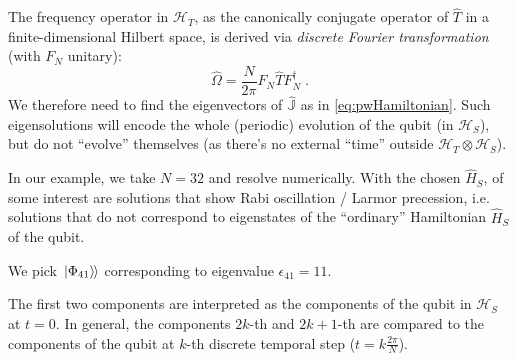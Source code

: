 \documentclass[a0,portrait]{a0poster}
\newcommand{\hilb}[1]{\mathcal{#1}}       %
\newcommand{\ox}{\otimes}
\newcommand{\smallback}{\hspace{-0.115em}}
\newcommand{\dket}[1]{\left.\left| #1 \right\rangle\smallback\right\rangle}
\begin{document}
\begin{multicols}{2}

The frequency operator in $\hilb{H}_T$, as the canonically conjugate operator
of $\hat{T}$ in a finite-dimensional Hilbert space, is derived via
\emph{discrete Fourier transformation} \cite{FiniteHilb} (with $F_N$ unitary):
\begin{equation}
  \boxed{
    \hat{\Omega} = \frac{N}{2\pi} F^{}_{N} \hat{T} F^{\dagger}_{N}
  }
  \; \text{.}
\end{equation}
%
We therefore need to find the eigenvectors of $\hat{\mathbb{J}}$ as in \eqref{eq:pwHamiltonian}.
Such eigensolutions
will encode the whole (periodic) evolution of the qubit (in $\hilb{H}_S$), but do
not ``evolve'' themselves (as there's no external ``time'' outside $\hilb{H}_T \ox \hilb{H}_S$).

In our example, we take $N = 32$ and resolve numerically.
With the chosen $\hat{H}_S$,
of some interest are solutions that show
Rabi oscillation / Larmor precession,
i.e. solutions that do not correspond to eigenstates of
the ``ordinary'' Hamiltonian $\hat{H}_S$ of the qubit.

We pick $\dket{\Phi_{41}}$ corresponding to eigenvalue
$\epsilon_{41} = 11$.

The first two components
are interpreted as the components of the qubit in $\hilb{H}_S$ at $t=0$.
In general, the components
$2k$\nobreakdash-th and $2k+1$\nobreakdash-th
are compared to the components of the qubit at $k$-th discrete temporal step ($t = k \frac{2\pi}{N}$).


\end{multicols}
\end{document}
